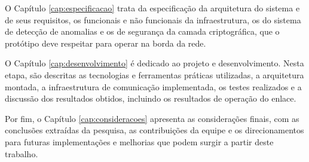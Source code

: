 O Capítulo \ref{cap:especificacao} trata da especificação da arquitetura do sistema e de seus requisitos, os funcionais e não funcionais da infraestrutura, os do sistema de detecção de anomalias e os de segurança da camada criptográfica, que o protótipo deve respeitar para operar na borda da rede.

O Capítulo \ref{cap:desenvolvimento} é dedicado ao projeto e desenvolvimento. Nesta etapa, são descritas as tecnologias e ferramentas práticas utilizadas, a arquitetura montada, a infraestrutura de comunicação implementada, os testes realizados e a discussão dos resultados obtidos, incluindo os resultados de operação do enlace.

Por fim, o Capítulo \ref{cap:consideracoes} apresenta as considerações finais, com as conclusões extraídas da pesquisa, as contribuições da equipe e os direcionamentos para futuras implementações e melhorias que podem surgir a partir deste trabalho.
